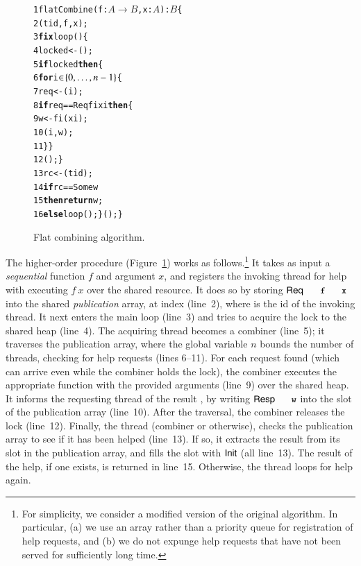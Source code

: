 \begin{figure} 
\centering 
{\scriptsize
%
\begin{minipage}[l]{4.7cm}
\begin{alltt}
\num{ 1} flatCombine(f: \(A{}\to{}B\), x: \(A\)): \(B\) \{
\num{ 2}  (tid, f, x);          
\num{ 3}  \textbf{fix} loop() \{       
\num{ 4}   locked <- (); 
\num{ 5}   \textbf{if} locked \textbf{then} \{
\num{ 6}    \textbf{for} i\(\in\!\set{0, \ldots, n-1}\) \{
\num{ 7}     req <- (i);
\num{ 8}     \textbf{if} req == \textsf{Req} fi xi \textbf{then} \{         
\num{ 9}      w <- fi(xi);    
\num{10}      (i, w);
\num{11}     \}\}
\num{12}    ();\}
\num{13}  rc <- (tid);
\num{14}  \textbf{if} rc == \textsf{Some} w 
\num{15}  \textbf{then} \textbf{return} w;
\num{16}  \textbf{else} loop();\}();\}
\end{alltt} 
\end{minipage} 
%
}
\caption{Flat combining algorithm.}
\label{fig:flatco}
\end{figure}
%
The higher-order  procedure
(Figure~\ref{fig:flatco}) works as follows.\footnote{For simplicity,
  we consider a modified version of the original algorithm. In
  particular, (a) we use an array rather than a priority queue for
  registration of help requests, and (b) we do not expunge help
  requests that have not been served for sufficiently long time.} It
takes as input a \emph{sequential} function $f$ and argument $x$, and
registers the invoking thread for help with executing $f\ x$ over the
shared resource. It does so by storing $\Req{\eesc{f}}{\eesc{x}}$ into
the shared \emph{publication} array, at index  (line~2),
where  is the id of the invoking thread.
%
It next enters the main loop (line~3) and tries to acquire the lock to
the shared heap (line~4).
%
The acquiring thread becomes a combiner (line~5); it traverses the
publication array, where the global variable $n$ bounds the number of
threads, checking for help requests (lines 6--11). For each request
found (which can arrive even while the combiner holds the lock), the
combiner executes the appropriate function with the provided arguments
(line~9) over the shared heap. It informs the requesting thread
 of the result , by writing $\Resp{\eesc{w}}$ into the
slot  of the publication array (line~10).
%
After the traversal, the combiner releases the lock (line~12).
%
Finally, the thread (combiner or otherwise), checks the publication
array to see if it has been helped (line~13). If so, it extracts the
result  from its slot in the publication array, and fills the
slot with $\mathsf{Init}$ (all line~13). The result of the help, if one
exists, is returned in line~15. Otherwise, the thread loops for help
again.


